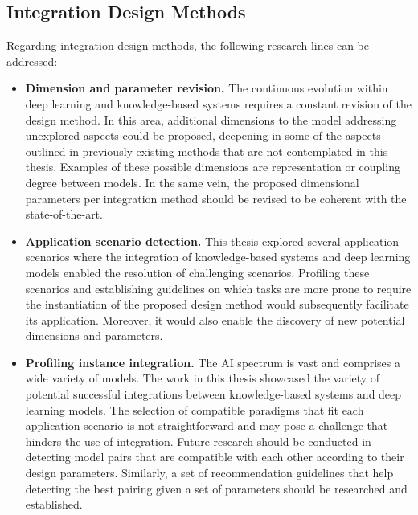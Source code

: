 \subsection*{Integration Design Methods}
Regarding integration design methods, the following research lines can be addressed:
\begin{itemize}
    \item \textbf{Dimension and parameter revision.} The continuous evolution within deep learning and knowledge-based systems requires a constant revision of the design method. In this area, additional dimensions to the model addressing unexplored aspects could be proposed, deepening in some of the aspects outlined in previously existing methods that are not contemplated in this thesis. Examples of these possible dimensions are representation or coupling degree between models. In the same vein, the proposed dimensional parameters per integration method should be revised to be coherent with the state-of-the-art. 
    
    \item \textbf{Application scenario detection.} This thesis explored several application scenarios where the integration of knowledge-based systems and deep learning models enabled the resolution of challenging scenarios. Profiling these scenarios and establishing guidelines on which tasks are more prone to require the instantiation of the proposed design method would subsequently facilitate its application. Moreover, it would also enable the discovery of new potential dimensions and parameters. 
    
    \item \textbf{Profiling instance integration.} The AI spectrum is vast and comprises a wide variety of models. The work in this thesis showcased the variety of potential successful integrations between knowledge-based systems and deep learning models. The selection of compatible paradigms that fit each application scenario is not straightforward and may pose a challenge that hinders the use of integration. Future research should be conducted in detecting model pairs that are compatible with each other according to their design parameters. Similarly, a set of recommendation guidelines that help detecting the best pairing given a set of parameters should be researched and established.
\end{itemize}


